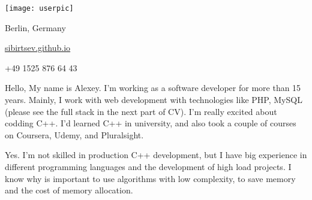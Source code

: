 \documentclass[paper=a4,fontsize=11pt]{eucv}
\begin{document}
\begin{minipage}{.2\linewidth}
   \texttt{[image: userpic]}
\end{minipage}      
\begin{minipage}{0.7\linewidth}
   \sepspace
   \noindent
   
   \hfill Berlin, Germany

   \hfill {}%
   
   \hfill \href{https://sibirtsev.github.io/}{sibirtsev.github.io}%
   
   \hfill +49 1525 876 64 43%
   
   \hfill {}%
\end{minipage}

\hspace{3mm}

Hello,
My name is Alexey. I'm working as a software developer for more than 15 years. Mainly, I work with web development with technologies like PHP, MySQL (please see the full stack in the next part of CV). I'm really excited about codding C++. I'd learned C++ in university, and also took a couple of courses on Coursera, Udemy, and Pluralsight.

Yes. I'm not skilled in production C++ development, but I have big experience in different programming languages and the development of high load projects. I know why is important to use algorithms with low complexity, to save memory and the cost of memory allocation.
\end{document}
